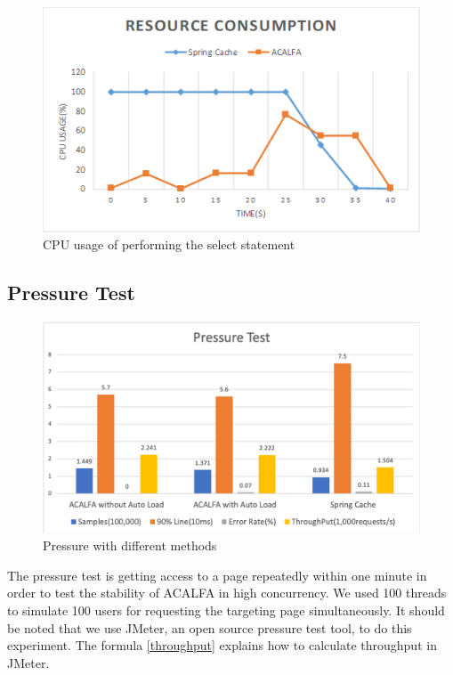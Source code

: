 \documentclass{singlecol-new}
\theoremstyle{TH}{
\newtheorem{lemma}{Lemma}
\newtheorem{theorem}[lemma]{Theorem}
\newtheorem{corrolary}[lemma]{Corrolary}
\newtheorem{conjecture}[lemma]{Conjecture}
\newtheorem{proposition}[lemma]{Proposition}
\newtheorem{claim}[lemma]{Claim}
\newtheorem{stheorem}[lemma]{Wrong Theorem}
}
\theoremstyle{THrm}{
\newtheorem{definition}{Definition}[section]
\newtheorem{question}{Question}[section]
\newtheorem{remark}{Remark}
\newtheorem{scheme}{Scheme}
}
\theoremstyle{THhit}{
\newtheorem{case}{Case}[section]
}
\begin{document}
\begin{figure} [htb]
    \centering
    \includegraphics[width=1\linewidth]{img/resource.png}
    \caption{CPU usage of performing the select statement}
    \label{resource}
\end{figure}

\subsection{Pressure Test}

 \begin{figure}
     \centering
     \includegraphics[width=1\linewidth]{img/pressuretest.png}
     \caption{Pressure with different methods}
     \label{pressuretest}
 \end{figure}

 The pressure test is getting access to a page repeatedly within one minute in order to test the stability of ACALFA in high concurrency. We used 100 threads to simulate 100 users for requesting the targeting page simultaneously. It should be noted that we use JMeter, an open source pressure test tool, to do this experiment. The formula \ref{throughput} explains how to calculate throughput in JMeter.
 
\end{document}
